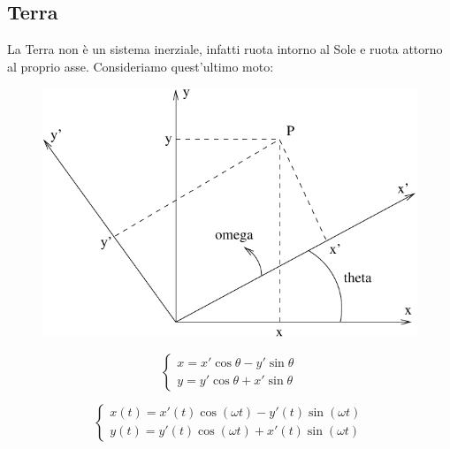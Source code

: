 \subsection{Terra}
La Terra non è un sistema inerziale, infatti ruota intorno al Sole e ruota attorno al proprio asse. Consideriamo quest'ultimo moto:
\begin{figure}[htbp]
  \centering
  \includegraphics[scale=0.7]{immagini/fisica1/apparenti2}
\end{figure}
\[\left\{\begin{array}{l}
    x=x'\cos\theta-y'\sin\theta \\
    y=y'\cos\theta+x'\sin\theta
  \end{array}\right.\]

\[\left\{\begin{array}{l}
    x(t)=x'(t)\cos(\omega t)-y'(t)\sin(\omega t) \\
    y(t)=y'(t)\cos(\omega t)+x'(t)\sin(\omega t)
  \end{array}\right.\]

